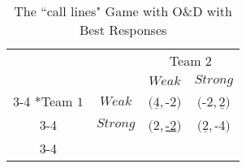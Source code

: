 \documentclass{article}
\begin{document}
  \begin{table}
\begin{center}
    \setlength{\extrarowheight}{2pt}
    \begin{tabular}{cc|c|c|}
      & \multicolumn{1}{c}{} & \multicolumn{2}{c}{Team $2$}\\
      & \multicolumn{1}{c}{} & \multicolumn{1}{c}{$Weak$}  & \multicolumn{1}{c}{$Strong$} \\\cline{3-4}
      \multirow{2}*{Team $1$}  & $Weak$ & $(\underline{4},$-2$)$ & $($-2$,\underline{2})$ \\\cline{3-4}
      & $Strong$ & $(2,$\underline{-2}$)$ & $(\underline{2},$-4$)$ \\\cline{3-4}
    \end{tabular}
\caption{The ``call lines" Game with O\&D with Best Responses} 
\end{center}
  \end{table}
\end{document}

